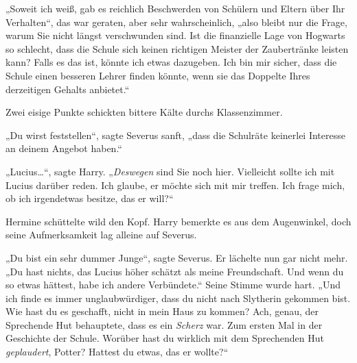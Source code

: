 „Soweit ich weiß, gab es reichlich Beschwerden von Schülern und Eltern über Ihr Verhalten“, das war geraten, aber sehr wahrscheinlich, „also bleibt nur die Frage, warum Sie nicht längst verschwunden sind. Ist die finanzielle Lage von Hogwarts so schlecht, dass die Schule sich keinen richtigen Meister der Zaubertränke leisten kann? Falls es das ist, könnte ich etwas dazugeben. Ich bin mir sicher, dass die Schule einen besseren Lehrer finden könnte, wenn sie das Doppelte Ihres derzeitigen Gehalts anbietet.“

Zwei eisige Punkte schickten bittere Kälte durchs Klassenzimmer.

„Du wirst feststellen“, sagte Severus sanft, „dass die Schulräte keinerlei Interesse an deinem Angebot haben.“

„Lucius…“, sagte Harry. „\emph{Deswegen} sind Sie noch hier. Vielleicht sollte ich mit Lucius darüber reden. Ich glaube, er möchte sich mit mir treffen. Ich frage mich, ob ich irgendetwas besitze, das er will?“

Hermine schüttelte wild den Kopf. Harry bemerkte es aus dem Augenwinkel, doch seine Aufmerksamkeit lag alleine auf Severus.

„Du bist ein sehr dummer Junge“, sagte Severus. Er lächelte nun gar nicht mehr. „Du hast nichts, das Lucius höher schätzt als meine Freundschaft. Und wenn du so etwas hättest, habe ich andere Verbündete.“ Seine Stimme wurde hart. „Und ich finde es immer unglaubwürdiger, dass du nicht nach Slytherin gekommen bist. Wie hast du es geschafft, nicht in mein Haus zu kommen? Ach, genau, der Sprechende Hut behauptete, dass es ein \emph{Scherz} war. Zum ersten Mal in der Geschichte der Schule. Worüber hast du wirklich mit dem Sprechenden Hut \emph{geplaudert}, Potter? Hattest du etwas, das er wollte?“

